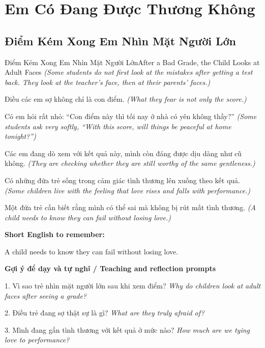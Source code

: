 \chapter{Em Có Đang Được Thương Không}

\section{Điểm Kém Xong Em Nhìn Mặt Người Lớn}
\begin{truyen}{Điểm Kém Xong Em Nhìn Mặt Người Lớn}{After a Bad Grade, the Child Looks at Adult Faces}
\textit{(Some students do not first look at the mistakes after getting a test back. They look at the teacher's face, then at their parents' faces.)}

Điều các em sợ không chỉ là con điểm.
\textit{(What they fear is not only the score.)}

Có em hỏi rất nhỏ: “Con điểm này thì tối nay ở nhà có yên không thầy?”
\textit{(Some students ask very softly, “With this score, will things be peaceful at home tonight?”)}

Các em đang dò xem với kết quả này, mình còn đáng được dịu dàng như cũ không.
\textit{(They are checking whether they are still worthy of the same gentleness.)}

Có những đứa trẻ sống trong cảm giác tình thương lên xuống theo kết quả.
\textit{(Some children live with the feeling that love rises and falls with performance.)}

\end{truyen}

\begin{baihoc}
Một đứa trẻ cần biết rằng mình có thể sai mà không bị rút mất tình thương.
\textit{(A child needs to know they can fail without losing love.)}
\end{baihoc}

\begin{ghinhoanh}
\textbf{Short English to remember:}

A child needs to know they can fail without losing love.

\end{ghinhoanh}

\begin{tuhocnhanh}
\textbf{Gợi ý để dạy và tự nghĩ / Teaching and reflection prompts}

1. Vì sao trẻ nhìn mặt người lớn sau khi xem điểm? \textit{Why do children look at adult faces after seeing a grade?}

2. Điều trẻ đang sợ thật sự là gì? \textit{What are they truly afraid of?}

3. Mình đang gắn tình thương với kết quả ở mức nào? \textit{How much are we tying love to performance?}
\end{tuhocnhanh}
\ngancach

